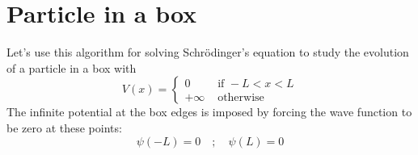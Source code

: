 \section*{Particle in a box}
Let\rq s use this algorithm for solving Schr{\"o}dinger\rq s equation to study the evolution
of a particle in a box with
\begin{equation}\label{eq:82}
V(x)= \begin{cases}0 & \text { if }-L<x<L \\ +\infty & \text { otherwise }\end{cases}
\end{equation}
The infinite potential at the box edges is imposed by forcing the wave function to
be zero at these points:
\begin{equation}\label{eq:83}
\psi(-L)=0 \quad ; \quad \psi(L)=0
\end{equation}

